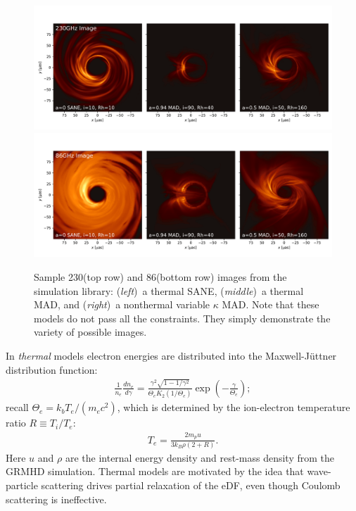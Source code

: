 \begin{figure}
  \centering
  \includegraphics[width=\textwidth,trim=0 78 0 24]{figures/sample_230GHz.pdf}\\
  \includegraphics[width=\textwidth,trim=0 24 0 24]{figures/sample_86GHz.pdf}
  \caption{Sample 230\GHz (top row) and 86\GHz (bottom row) images
    from the simulation library:
    (\emph{left})~a thermal SANE,
    (\emph{middle})~a thermal MAD, and
    (\emph{right})~a nonthermal variable $\kappa$ MAD.
    Note that these models do not pass all the constraints.
    They simply demonstrate the variety of possible images.}
  \label{fig:sample_imgs}
\end{figure}

\label{sec:eDF}

In \emph{thermal} models electron energies are distributed into the Maxwell-J{\"u}ttner distribution function:
\begin{align}
  \frac{1}{n_e}\frac{dn_e}{d\gamma} = \frac{\gamma^2 \sqrt{1-1/\gamma^2}} {\Theta_e K_2(1/\Theta_e)} \exp\left(-\frac{\gamma}{\Theta_e}\right);
\end{align}
recall $\Theta_e = k_b T_e/(m_e c^2)$, which is determined by the ion-electron temperature ratio $R \equiv T_i/T_e$:
\begin{align}
  T_e=\frac{2 m_p u}{3 k_B \rho (2+R)}.
\end{align}
Here $u$ and $\rho$ are the internal energy density and rest-mass density from the GRMHD simulation.
Thermal models are motivated by the idea that wave-particle scattering drives partial relaxation of the eDF, even though Coulomb scattering is ineffective.

